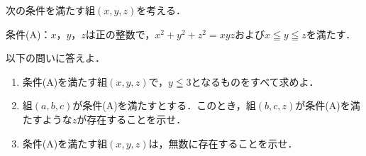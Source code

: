 \documentclass[../../main.tex]{subfiles}
\begin{document}
次の条件を満たす組$(x,y,z)$を考える．

条件(A)：$x$，$y$，$z$は正の整数で，$x^2+y^2+z^2=xyz$および$x \leqq y \leqq z$を満たす．

以下の問いに答えよ．
\begin{enumerate}
  \item 条件(A)を満たす組$(x,y,z)$で，$y \leqq 3$となるものをすべて求めよ．
  \item 組$(a,b,c)$が条件(A)を満たすとする．このとき，組$(b,c,z)$が条件(A)を満たすような$z$が存在することを示せ．
  \item 条件(A)を満たす組$(x,y,z)$は，無数に存在することを示せ．
\end{enumerate}
\end{document}

